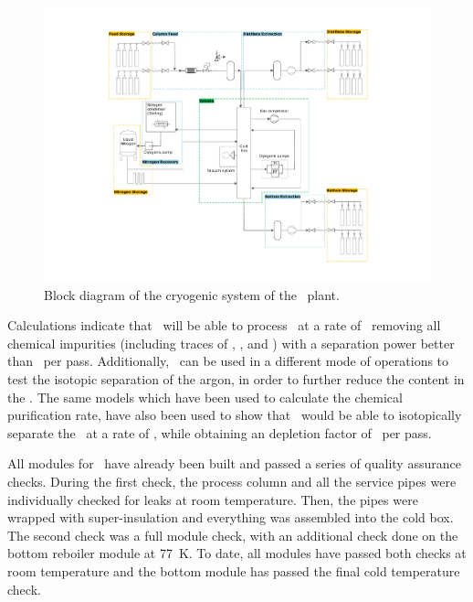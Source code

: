 \begin{figure}[!t]
\centering
\includegraphics[width=\textwidth]{./Figures/Aria-Block-Diagram.pdf}
\caption[Block diagram of \Aria]{Block diagram of the cryogenic system of the \Aria\ plant.}
\label{fig:Aria-Block-Diagram}
\end{figure}

Calculations indicate that \SeruciOne\ will be able to process \UAr\ at a rate of \AriaChemicalRate\ removing all chemical impurities (including traces of , , and ) with a separation power better than \AriaChemicalPerPass\ per pass.  Additionally, \SeruciOne\ can be used in a different mode of operations to test the isotopic separation of the argon, in order to further reduce the  content in the \UAr.  The same models which have been used to calculate the chemical purification rate, have also been used to show that \SeruciOne\ would be able to isotopically separate the \UAr\ at a rate of \AriaSeruciOneRate, while obtaining an  depletion factor of \AriaDepletionPerPass\ per pass. 

All modules for \SeruciOne\ have already been built and passed a series of quality assurance checks.  During the first check, the process column and all the service pipes were individually checked for leaks at room temperature.  Then, the pipes were wrapped with super-insulation and everything was assembled into the cold box.  The second check was a full module check, with an additional check done on the bottom reboiler module at \SI{77}{\kelvin}.  To date, all modules have passed both checks at room temperature and the bottom module has passed the final cold temperature check.  

